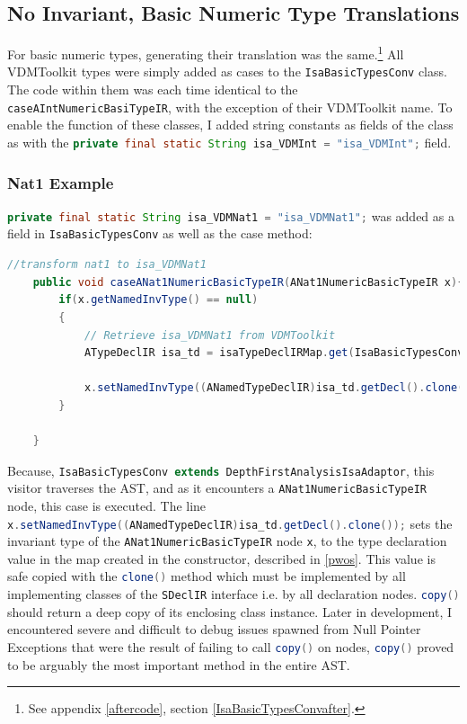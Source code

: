 	\subsection{No Invariant, Basic Numeric Type Translations}
	For basic numeric types, generating their translation was the same.\footnote{See appendix \ref{aftercode}, section \ref{IsaBasicTypesConvafter}.} All VDMToolkit types were simply added as cases to the \lstinline[language=Java]{IsaBasicTypesConv} class. The code within them was each time identical to the \lstinline[language=Java]{caseAIntNumericBasiTypeIR}, with the exception of their VDMToolkit name. To enable the function of these classes, I added string constants as fields of the class as with the \lstinline[language=Java]{private final static String isa_VDMInt = "isa_VDMInt";} field. 
	\subsubsection{Nat1 Example}
	\lstinline[language=Java]{private final static String isa_VDMNat1 = "isa_VDMNat1";} was added as a field in \lstinline[language=Java]{IsaBasicTypesConv} as well as the case method:
	\begin{lstlisting}[language=Java]
	//transform nat1 to isa_VDMNat1
    public void caseANat1NumericBasicTypeIR(ANat1NumericBasicTypeIR x){
        if(x.getNamedInvType() == null)
        {
            // Retrieve isa_VDMNat1 from VDMToolkit
            ATypeDeclIR isa_td = isaTypeDeclIRMap.get(IsaBasicTypesConv.isa_VDMNat1);

            x.setNamedInvType((ANamedTypeDeclIR)isa_td.getDecl().clone());
        }

    }
    \end{lstlisting}


    Because, \lstinline[language=Java]{IsaBasicTypesConv extends DepthFirstAnalysisIsaAdaptor}, this visitor traverses the AST, and as it encounters a \lstinline[language=Java]{ANat1NumericBasicTypeIR} node, this case is executed. The line \lstinline[language=Java]{x.setNamedInvType((ANamedTypeDeclIR)isa_td.getDecl().clone());} sets the invariant type of the \lstinline[language=Java]{ANat1NumericBasicTypeIR} node \lstinline[language=Java]{x}, to the type declaration value in the map created in the constructor, described in \ref{pwos}. This value is safe copied with the \lstinline[language=Java]{clone()} method which must be implemented by all implementing classes of the \lstinline[language=Java]{SDeclIR} interface i.e. by all declaration nodes. \lstinline[language=Java]{copy()} should return a deep copy of its enclosing class instance. Later in development, I encountered severe and difficult to debug issues spawned from Null Pointer Exceptions that were the result of failing to call \lstinline[language=Java]{copy()} on nodes, \lstinline[language=Java]{copy()} proved to be arguably the most important method in the entire AST. 

